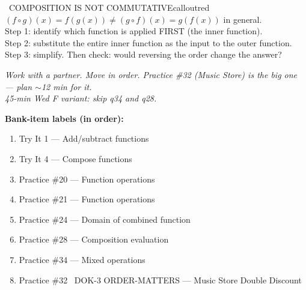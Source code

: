 \documentclass[11pt]{article}
\begin{document}
\begin{callout}{\IconWarn\ COMPOSITION IS NOT COMMUTATIVE}{calloutred}
\((f\circ g)(x) = f(g(x)) \neq (g\circ f)(x) = g(f(x))\) in general.\\
Step 1: identify which function is applied FIRST (the inner function).\\
Step 2: substitute the entire inner function as the input to the outer function.\\
Step 3: simplify. Then check: would reversing the order change the answer?
\end{callout}

\textit{Work with a partner. Move in order. Practice \#32 (Music Store) is the big one --- plan \(\sim\)12 min for it.}\\
\textit{45-min Wed F variant: skip q34 and q28.}

\textbf{Bank-item labels (in order):}
\begin{enumerate}[leftmargin=1.6em,itemsep=2pt,topsep=2pt]
  \item Try It 1 --- Add/subtract functions
  \item Try It 4 --- Compose functions
  \item Practice \#20 --- Function operations
  \item Practice \#21 --- Function operations
  \item Practice \#24 --- Domain of combined function
  \item Practice \#28 --- Composition evaluation
  \item Practice \#34 --- Mixed operations
  \item Practice \#32 \IconStar\ DOK-3 ORDER-MATTERS --- Music Store Double Discount
\end{enumerate}


\end{document}

